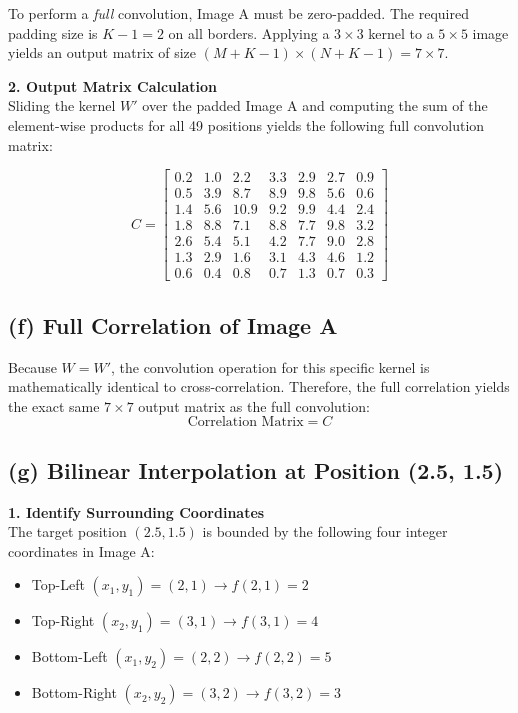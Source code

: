 \documentclass{article}
\begin{document}
To perform a \textit{full} convolution, Image A must be zero-padded. The required padding size is $K - 1 = 2$ on all 
borders. Applying a $3\times3$ kernel to a $5\times5$ image yields an output matrix of size $(M+K-1) \times (N+K-1) = 7\times7$.

\vspace{1em}
\textbf{2. Output Matrix Calculation}\\
Sliding the kernel $W'$ over the padded Image A and computing the sum of the element-wise products for all 49 positions 
yields the following full convolution matrix:

\[
C = \begin{bmatrix}
0.2 & 1.0 & 2.2 & 3.3 & 2.9 & 2.7 & 0.9 \\
0.5 & 3.9 & 8.7 & 8.9 & 9.8 & 5.6 & 0.6 \\
1.4 & 5.6 & 10.9 & 9.2 & 9.9 & 4.4 & 2.4 \\
1.8 & 8.8 & 7.1 & 8.8 & 7.7 & 9.8 & 3.2 \\
2.6 & 5.4 & 5.1 & 4.2 & 7.7 & 9.0 & 2.8 \\
1.3 & 2.9 & 1.6 & 3.1 & 4.3 & 4.6 & 1.2 \\
0.6 & 0.4 & 0.8 & 0.7 & 1.3 & 0.7 & 0.3
\end{bmatrix}
\]

\subsection*{(f) Full Correlation of Image A}
Because $W = W'$, the convolution operation for this specific kernel is mathematically identical to cross-correlation. 
Therefore, the full correlation yields the exact same $7\times7$ output matrix as the full convolution:
\[
\text{Correlation Matrix} = C 
\]

\subsection*{(g) Bilinear Interpolation at Position (2.5, 1.5)}

\textbf{1. Identify Surrounding Coordinates}\\
The target position $(2.5, 1.5)$ is bounded by the following four integer coordinates in Image A:
\begin{itemize}
    \item Top-Left $(x_1, y_1) = (2, 1) \rightarrow f(2,1) = 2$
    \item Top-Right $(x_2, y_1) = (3, 1) \rightarrow f(3,1) = 4$
    \item Bottom-Left $(x_1, y_2) = (2, 2) \rightarrow f(2,2) = 5$
    \item Bottom-Right $(x_2, y_2) = (3, 2) \rightarrow f(3,2) = 3$
\end{itemize}
\end{document}
